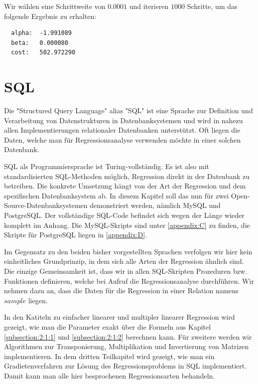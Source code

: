 Wir wählen eine Schrittweite von $0.0001$ und iterieren $1000$ Schritte, um das folgende Ergebnis zu erhalten:

\begin{verbatim}
  alpha:  -1.991089
  beta:   0.000080
  cost:   502.972290
\end{verbatim}

\section{SQL}
\label{section:3:4}

Die "Structured Query Language" alias "SQL" ist eine Sprache zur Definition und Verarbeitung von Datenstrukturen in Datenbanksystemen und wird in nahezu allen Implementierungen relationaler Datenbanken unterstützt. Oft liegen die Daten, welche man für Regressionsanalyse verwenden möchte in einer solchen Datenbank.

SQL als Programmiersprache ist Turing-vollständig. Es ist also mit standardisierten SQL-Methoden möglich, Regression direkt in der Datenbank zu betreiben. Die konkrete Umsetzung hängt von der Art der Regression und dem spezifischen Datenbanksystem ab. In diesem Kapitel soll das nun für zwei Open-Source-Datenbanksystemen demonstriert werden, nämlich MySQL und PostgreSQL. Der vollständige SQL-Code befindet sich wegen der Länge wieder komplett im Anhang. Die MySQL-Skripte sind unter \ref{appendix:C} zu finden, die Skripte für PostgreSQL liegen in \ref{appendix:D}.

Im Gegensatz zu den beiden bisher vorgestellten Sprachen verfolgen wir hier kein einheitliches Grundprinzip, in dem sich alle Arten der Regression ähnlich sind. Die einzige Gemeinsamkeit ist, dass wir in allen SQL-Skripten Prozeduren bzw. Funktionen definieren, welche bei Aufruf die Regressionsanalyse durchführen. Wir nehmen dazu an, dass die Daten für die Regression in einer Relation namens $sample$ liegen.

In den Katiteln zu einfacher linearer und multipler linearer Regression wird gezeigt, wie man die Parameter exakt über die Formeln aus Kapitel \ref{subsection:2:1:1} und \ref{subsection:2:1:2} berechnen kann. Für zweitere werden wir Algorithmen zur Transponierung, Multiplikation und Invertierung von Matrizen implementieren. In dem dritten Teilkapitel wird gezeigt, wie man ein Gradietenverfahren zur Lösung des Regressionsproblems in SQL implementiert. Damit kann man alle hier besprochenen Regressionsarten behandeln.

